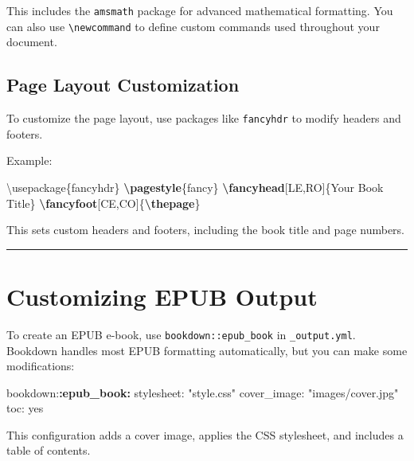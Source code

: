 \documentclass[
]{book}
\newenvironment{Shaded}{\begin{snugshade}}{\end{snugshade}}
\newcommand{\BuiltInTok}[1]{#1}
\newcommand{\ExtensionTok}[1]{#1}
\newcommand{\FunctionTok}[1]{\textcolor[rgb]{0.13,0.29,0.53}{\textbf{#1}}}
\newcommand{\NormalTok}[1]{#1}
\newcommand{\SpecialCharTok}[1]{\textcolor[rgb]{0.81,0.36,0.00}{\textbf{#1}}}
\theoremstyle{definition}
\theoremstyle{definition}
\theoremstyle{definition}
\theoremstyle{definition}
\theoremstyle{remark}
\begin{document}
This includes the \texttt{amsmath} package for advanced mathematical formatting. You can also use \texttt{\textbackslash{}newcommand} to define custom commands used throughout your document.

\subsection{Page Layout Customization}\label{page-layout-customization}

To customize the page layout, use packages like \texttt{fancyhdr} to modify headers and footers.

Example:

\begin{Shaded}
\begin{Highlighting}[]
\BuiltInTok{\textbackslash{}usepackage}\NormalTok{\{}\ExtensionTok{fancyhdr}\NormalTok{\}}
\FunctionTok{\textbackslash{}pagestyle}\NormalTok{\{fancy\}}
\FunctionTok{\textbackslash{}fancyhead}\NormalTok{[LE,RO]\{Your Book Title\}}
\FunctionTok{\textbackslash{}fancyfoot}\NormalTok{[CE,CO]\{}\FunctionTok{\textbackslash{}thepage}\NormalTok{\}}
\end{Highlighting}
\end{Shaded}

This sets custom headers and footers, including the book title and page numbers.

\begin{center}\rule{0.5\linewidth}{0.5pt}\end{center}

\section{Customizing EPUB Output}\label{customizing-epub-output}

To create an EPUB e-book, use \texttt{bookdown::epub\_book} in \texttt{\_output.yml}. Bookdown handles most EPUB formatting automatically, but you can make some modifications:

\begin{Shaded}
\begin{Highlighting}[]
\NormalTok{bookdown:}\SpecialCharTok{:epub\_book:}
\NormalTok{  stylesheet: "style.css"}
\NormalTok{  cover\_image: "images/cover.jpg"}
\NormalTok{  toc: yes}
\end{Highlighting}
\end{Shaded}

This configuration adds a cover image, applies the CSS stylesheet, and includes a table of contents.
\end{document}
